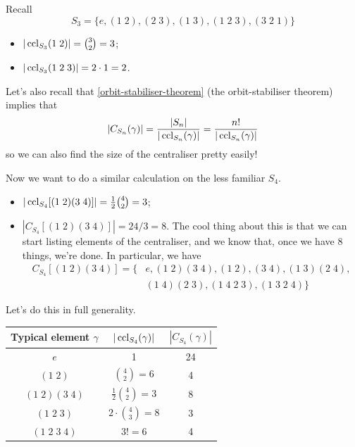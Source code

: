 \documentclass{../../template/note}
\begin{document}
    \begin{example}[\(n=3\)]
        Recall
        \[
            S_3 = \{e, (1\; 2), (2 \; 3), (1 \; 3), (1 \; 2 \; 3), (3 \; 2 \; 1)\}
        \]
        \begin{itemize}
            \item \(|\operatorname{ccl}_{S_3}(1 \; 2)| = \binom{3}{2} = 3\);
            \item \(|\operatorname{ccl}_{S_3}(1 \; 2 \; 3)| = 2 \cdot 1 = 2\).
        \end{itemize}
    \end{example}
    Let's also recall that \cref{orbit-stabiliser-theorem} (the orbit-stabiliser theorem) implies that
    \begin{align*}
        |C_{S_n}(\gamma)| = \frac{|S_n|}{|\operatorname{ccl}_{S_n}(\gamma)|} = \frac{n!}{|\operatorname{ccl}_{S_n}(\gamma)|}
    \end{align*}
    so we can also find the size of the centraliser pretty easily!

    \begin{example}[\(n=4\)]
        Now we want to do a similar calculation on the less familiar \(S_4\).
        \begin{itemize}
            \item \(|\operatorname{ccl}_{S_4}[(1 \; 2)(3 \; 4)]| = \frac{1}{2} \binom{4}{2} = 3\);
            \item \(|C_{S_4}[(1 \; 2)(3 \; 4)]| = 24/3 = 8\). The cool thing about this is that we can start listing elements of the centraliser, and we know that, once we have 8 things, we're done. In particular, we have
            \begin{align*}
                C_{S_4}[(1 \; 2)(3 \; 4)] = \{&e, (1 \; 2)(3 \; 4), (1 \; 2), (3 \; 4), (1 \; 3)(2 \; 4), \\ &(1 \; 4)(2 \; 3), (1 \; 4 \; 2 \; 3), (1 \; 3 \; 2 \; 4)\}
            \end{align*}
        \end{itemize}
        Let's do this in full generality.
        \begin{center}
            \begin{tabular}{c | c | c}
                Typical element \(\gamma\) & \(|\operatorname{ccl}_{S_4}(\gamma)|\) & \(|C_{S_4}(\gamma)|\) \\
                \hline
                \(e\) & 1 & 24 \\
                \((1 \; 2)\) & \(\binom 4 2 = 6\) & 4 \\
                \((1 \; 2)(3 \; 4)\) & \(\frac 1 2 \binom 4 2 = 3\) & 8 \\
                \((1 \; 2 \; 3)\) & \(2 \cdot \binom 4 3 = 8\) & 3 \\
                \((1 \; 2 \; 3 \; 4)\) & \(3! = 6\) & 4
            \end{tabular}
        \end{center}
    \end{example}
    
\end{document}
